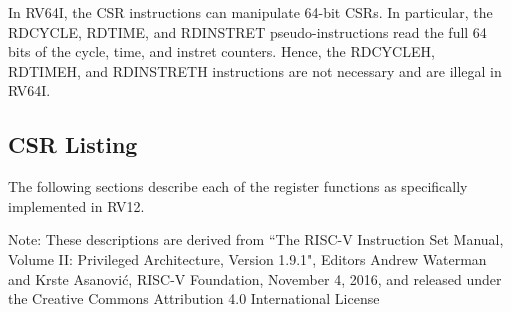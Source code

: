 In RV64I, the CSR instructions can manipulate 64-bit CSRs. In
particular, the RDCYCLE, RDTIME, and RDINSTRET pseudo-instructions read
the full 64 bits of the cycle, time, and instret counters. Hence, the
RDCYCLEH, RDTIMEH, and RDINSTRETH instructions are not necessary and are
illegal in RV64I.

\subsection{CSR Listing}\label{csr-listing}

The following sections describe each of the register functions as
specifically implemented in RV12.

Note: These descriptions are derived from ``The RISC-V Instruction Set
Manual, Volume II: Privileged Architecture, Version 1.9.1", Editors
Andrew Waterman and Krste Asanović, RISC-V Foundation, November 4, 2016,
and released under the Creative Commons Attribution 4.0 International
License

